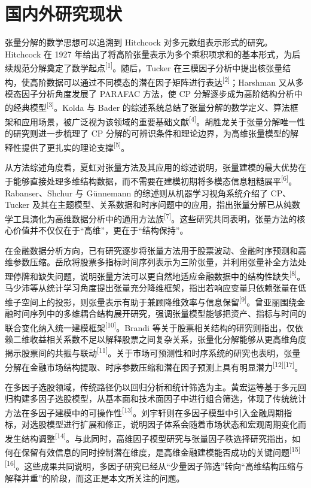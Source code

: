 \section{国内外研究现状}

张量分解的数学思想可以追溯到 Hitchcock 对多元数组表示形式的研究。Hitchcock 在 1927 年给出了将高阶张量表示为多个乘积项求和的基本形式，为后续规范分解奠定了数学起点\textsuperscript{[1]}。随后，Tucker 在三模因子分析中提出核张量结构，使高阶数据可以通过不同模态的潜在因子矩阵进行表达\textsuperscript{[2]}；Harshman 又从多模态因子分析角度发展了 PARAFAC 方法，使 CP 分解逐步成为高阶结构分析中的经典模型\textsuperscript{[3]}。Kolda 与 Bader 的综述系统总结了张量分解的数学定义、算法框架和应用场景，被广泛视为该领域的重要基础文献\textsuperscript{[4]}。胡胜龙关于张量分解唯一性的研究则进一步梳理了 CP 分解的可辨识条件和理论边界，为高维张量模型的解释性提供了更扎实的理论支撑\textsuperscript{[5]}。

从方法综述角度看，夏虹对张量方法及其应用的综述说明，张量建模的最大优势在于能够直接处理多维结构数据，而不需要在建模初期将多模态信息粗糙展平\textsuperscript{[6]}。Rabanser、Shchur 与 Günnemann 的综述则从机器学习视角系统介绍了 CP、Tucker 及其在主题模型、关系数据和时序问题中的应用，指出张量分解已从纯数学工具演化为高维数据分析中的通用方法族\textsuperscript{[7]}。这些研究共同表明，张量方法的核心价值并不仅仅在于“高维”，更在于“结构保持”。

在金融数据分析方向，已有研究逐步将张量方法用于股票波动、金融时序预测和高维参数压缩。岳欣将股票多指标时间序列表示为三阶张量，并利用张量补全方法处理停牌和缺失问题，说明张量方法可以更自然地适应金融数据中的结构性缺失\textsuperscript{[8]}。马少沛等从统计学习角度提出张量充分降维框架，指出若响应变量只依赖张量在低维子空间上的投影，则张量表示有助于兼顾降维效率与信息保留\textsuperscript{[9]}。曾亚丽围绕金融时间序列中的多维耦合结构展开研究，强调张量模型能够把资产、指标与时间的联合变化纳入统一建模框架\textsuperscript{[10]}。Brandi 等关于股票相关结构的研究则指出，仅依赖二维收益相关系数不足以解释股票之间复杂关系，张量化分解能够从更高维角度揭示股票间的共振与联动\textsuperscript{[11]}。关于市场可预测性和时序系统的研究也表明，张量分解在金融市场结构提取、时序参数压缩和潜在因子预测上具有明显潜力\textsuperscript{[12][17]}。

在多因子选股领域，传统路径仍以回归分析和统计筛选为主。黄宏运等基于多元回归构建多因子选股模型，从基本面和技术面因子中进行组合筛选，体现了传统统计方法在多因子建模中的可操作性\textsuperscript{[13]}。刘宇轩则在多因子模型中引入金融周期指标，对选股模型进行扩展和修正，说明因子体系会随着市场状态和宏观周期变化而发生结构调整\textsuperscript{[14]}。与此同时，高维因子模型研究与张量因子秩选择研究指出，如何在保留有效信息的同时控制潜在维度，是高维金融建模能否成功的关键问题\textsuperscript{[15][16]}。这些成果共同说明，多因子研究已经从“少量因子筛选”转向“高维结构压缩与解释并重”的阶段，而这正是本文所关注的问题。

